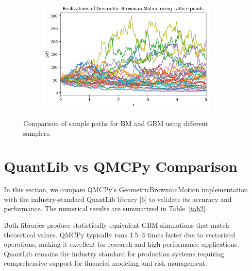 \documentclass{article}
\begin{document}
\begin{figure}[tbp]
\begin{subfigure}[b]{0.49\textwidth}
\caption{}
\label{fig:bm_lattice}
\end{subfigure}
\hfill
\begin{subfigure}[b]{0.49\textwidth}
\includegraphics[width=\textwidth]{images/figure_4.png}
\caption{}
\label{fig:gbm_lattice}
\end{subfigure}
\caption{Comparison of sample paths for BM and GBM using different samplers.}
\label{fig:bm_gbm_paths}
\end{figure}

\section{QuantLib vs QMCPy Comparison}

In this section, we compare QMCPy's GeometricBrownianMotion implementation with the industry-standard QuantLib library [6] to validate its accuracy and performance. %
The numerical results are summarized in Table~\ref{tab2}. 

Both libraries produce statistically equivalent GBM simulations that match theoretical values. QMCPy typically runs 1.5--3 times faster due to vectorized operations, making it excellent for research and high-performance applications. QuantLib remains the industry standard for production systems requiring comprehensive  support for financial modeling and risk management.

\end{document}
